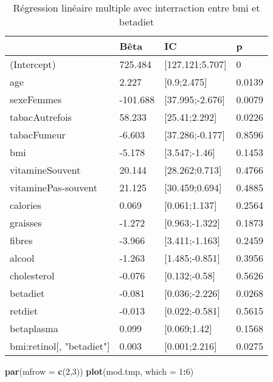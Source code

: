 \documentclass[]{article}
\newenvironment{Shaded}{\begin{snugshade}}{\end{snugshade}}
\newcommand{\KeywordTok}[1]{\textcolor[rgb]{0.13,0.29,0.53}{\textbf{#1}}}
\newcommand{\DataTypeTok}[1]{\textcolor[rgb]{0.13,0.29,0.53}{#1}}
\newcommand{\DecValTok}[1]{\textcolor[rgb]{0.00,0.00,0.81}{#1}}
\newcommand{\OperatorTok}[1]{\textcolor[rgb]{0.81,0.36,0.00}{\textbf{#1}}}
\newcommand{\NormalTok}[1]{#1}
\begin{document}
\begin{table}

\caption{\label{tab:unnamed-chunk-72}Régression linéaire multiple avec interraction entre bmi et betadiet}
\centering
\begin{tabular}[t]{l|l|l|l}
\hline
  & Bêta & IC & p\\
\hline
\rowcolor[HTML]{BBD2E1}  (Intercept) & 725.484 & [127.121;5.707] & 0\\
\hline
age & 2.227 & [0.9;2.475] & 0.0139\\
\hline
\rowcolor[HTML]{BBD2E1}  sexeFemmes & -101.688 & [37.995;-2.676] & 0.0079\\
\hline
tabacAutrefois & 58.233 & [25.41;2.292] & 0.0226\\
\hline
\rowcolor[HTML]{BBD2E1}  tabacFumeur & -6.603 & [37.286;-0.177] & 0.8596\\
\hline
bmi & -5.178 & [3.547;-1.46] & 0.1453\\
\hline
\rowcolor[HTML]{BBD2E1}  vitamineSouvent & 20.144 & [28.262;0.713] & 0.4766\\
\hline
vitaminePas-souvent & 21.125 & [30.459;0.694] & 0.4885\\
\hline
\rowcolor[HTML]{BBD2E1}  calories & 0.069 & [0.061;1.137] & 0.2564\\
\hline
graisses & -1.272 & [0.963;-1.322] & 0.1873\\
\hline
\rowcolor[HTML]{BBD2E1}  fibres & -3.966 & [3.411;-1.163] & 0.2459\\
\hline
alcool & -1.263 & [1.485;-0.851] & 0.3956\\
\hline
\rowcolor[HTML]{BBD2E1}  cholesterol & -0.076 & [0.132;-0.58] & 0.5626\\
\hline
betadiet & -0.081 & [0.036;-2.226] & 0.0268\\
\hline
\rowcolor[HTML]{BBD2E1}  retdiet & -0.013 & [0.022;-0.581] & 0.5615\\
\hline
betaplasma & 0.099 & [0.069;1.42] & 0.1568\\
\hline
\rowcolor[HTML]{BBD2E1}  bmi:retinol[, "betadiet"] & 0.003 & [0.001;2.216] & 0.0275\\
\hline
\end{tabular}
\end{table}

\begin{Shaded}
\begin{Highlighting}[]
\KeywordTok{par}\NormalTok{(}\DataTypeTok{mfrow =} \KeywordTok{c}\NormalTok{(}\DecValTok{2}\NormalTok{,}\DecValTok{3}\NormalTok{))}
\KeywordTok{plot}\NormalTok{(mod.tmp, }\DataTypeTok{which =} \DecValTok{1}\OperatorTok{:}\DecValTok{6}\NormalTok{)}
\end{Highlighting}
\end{Shaded}
\end{document}
